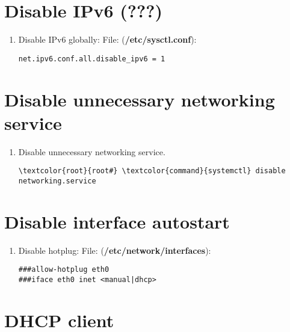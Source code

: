 \documentclass[10pt, a4paper, onecolumn, openany]{book} %
\begin{document}
\section{Disable IPv6 (???)}
\begin{enumerate}
    \item Disable IPv6 globally:
\newline File: (\textcolor{file}{\textbf{/etc/sysctl.conf}}):
\begin{Verbatim}[commandchars=\\\{\}]
net.ipv6.conf.all.disable_ipv6 = 1
\end{Verbatim}
\end{enumerate}
\section{Disable unnecessary networking service}
\begin{enumerate}
    \item Disable unnecessary networking service.
\begin{Verbatim}[commandchars=\\\{\}]
\textcolor{root}{root#} \textcolor{command}{systemctl} disable networking.service
\end{Verbatim}
\end{enumerate}
\section{Disable interface autostart}
\begin{enumerate}
    \item Disable hotplug:
\newline File: (\textbf{\textcolor{file}{/etc/network/interfaces}}):
\begin{Verbatim}[commandchars=\\\{\}]
###allow-hotplug eth0
###iface eth0 inet <manual|dhcp>
\end{Verbatim}
\end{enumerate}
\section{DHCP client}
\end{document}
